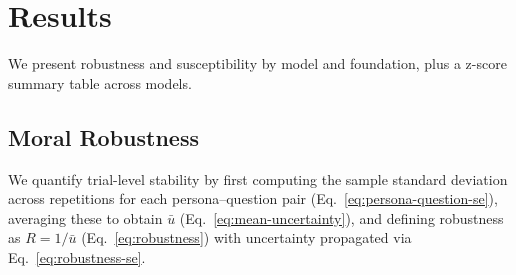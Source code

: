 \documentclass{article}
\begin{document}
\section{Results}

We present robustness and susceptibility by model and foundation, plus a z-score summary table across models.



\subsection{Moral Robustness}
We quantify trial-level stability by first computing the sample standard deviation across repetitions for each persona–question pair (Eq.~\ref{eq:persona-question-se}), averaging these to obtain \(\bar{u}\) (Eq.~\ref{eq:mean-uncertainty}), and defining robustness as \(R = 1/\bar{u}\) (Eq.~\ref{eq:robustness}) with uncertainty propagated via Eq.~\ref{eq:robustness-se}.
\end{document}
